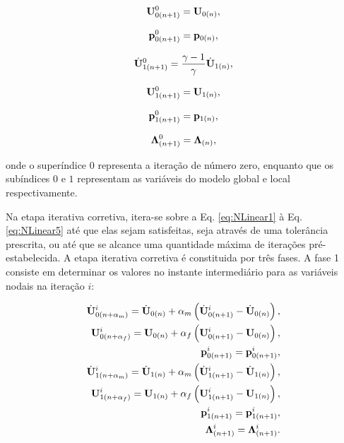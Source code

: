 \documentclass[tese_patricia]{subfiles}
\begin{document}
\begin{align}
	\mathbf{U}_{0(n+1)}^{0} = \mathbf{U}_{0(n)}, \label{eq:PredArlq2}
\end{align}

\begin{align}
	\mathbf{p}_{0(n+1)}^{0} = \mathbf{p}_{0(n)},\label{eq:PredArlq3}
\end{align}

\begin{align}
	\dot{\mathbf{U}}_{1(n+1)}^{0} = \frac{\gamma-1}{\gamma}\dot{\mathbf{U}}_{1(n)} \label{eq:PredArlq4},
\end{align}

\begin{align}
	\mathbf{U}_{1(n+1)}^{0} = \mathbf{U}_{1(n)}, \label{eq:PredArlq5}
\end{align}

\begin{align}
	\mathbf{p}_{1(n+1)}^{0} = \mathbf{p}_{1(n)},\label{eq:PredArlq6}
\end{align}

\begin{align}
	\boldsymbol{\Lambda}_{(n+1)}^{0} = \boldsymbol{\Lambda}_{(n)},\label{eq:PredArlq7}
\end{align}

\noindent onde o superíndice $0$ representa a iteração de número zero, enquanto que os subíndices $0$ e $1$ representam as variáveis do modelo global e local respectivamente.

Na etapa iterativa corretiva, itera-se sobre a Eq. \eqref{eq:NLinear1} à Eq. \eqref{eq:NLinear5} até que elas sejam satisfeitas, seja através de uma tolerância prescrita, ou até que se alcance uma quantidade máxima de iterações pré-estabelecida. A etapa iterativa corretiva é constituida por três fases. A fase 1 consiste em determinar os valores no instante intermediário para as variáveis nodais na iteração $i$:

\begin{align}
	\dot{\mathbf{U}}_{0({n+\alpha_m})}^{i} = \dot{\mathbf{U}}_{0(n)} + \alpha_m \left( \dot{\mathbf{U}}_{0(n+1)}^{i} - \dot{\mathbf{U}}_{0(n)} \right), \label{eq:Inter1}\\
	\mathbf{U}_{0(n+\alpha_f)}^{i} = \mathbf{U}_{0(n)} + \alpha_f \left( \mathbf{U}_{0(n+1)}^{i} - \mathbf{U}_{0(n)} \right), \label{eq:Inter2}\\
	\mathbf{p}_{0(n+1)}^{i} = \mathbf{p}_{0(n+1)}^{i}, \label{eq:Inter3} \\
	\dot{\mathbf{U}}_{1(n+\alpha_m)}^{i} = \dot{\mathbf{U}}_{1(n)} + \alpha_m \left( \dot{\mathbf{U}}_{1(n+1)}^{i} - \dot{\mathbf{U}}_{1(n)} \right), \label{eq:Inter4}\\
	\mathbf{U}_{1(n+\alpha_f)}^{i} = \mathbf{U}_{1(n)} + \alpha_f \left( \mathbf{U}_{1(n+1)}^{i} - \mathbf{U}_{1(n)} \right), \label{eq:Inter5}\\
	\mathbf{p}_{1(n+1)}^{i} = \mathbf{p}_{1(n+1)}^{i},\label{eq:Inter6} \\
	\boldsymbol{\Lambda}_{(n+1)}^{i} = \boldsymbol{\Lambda}_{(n+1)}^{i}. \label{eq:Inter7}
\end{align}
\end{document}
